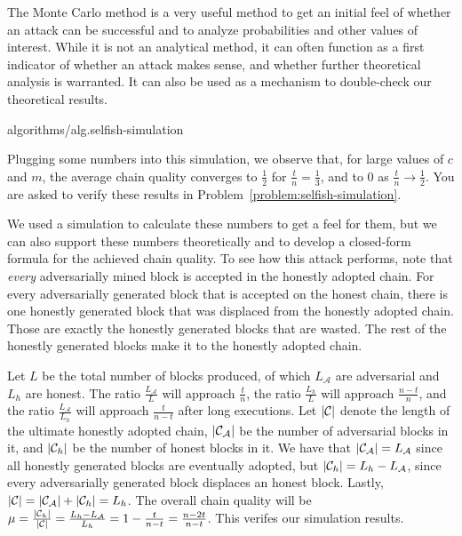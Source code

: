 The Monte Carlo method is a very useful method to get an initial feel of whether
an attack can be successful and to analyze probabilities and other values of interest.
While it is not an analytical method, it can often function as a first indicator
of whether an attack makes sense, and whether further theoretical analysis is warranted.
It can also be used as a mechanism to double-check our theoretical results.

{algorithms/alg.selfish-simulation}

Plugging some numbers into this simulation, we observe that, for large values of $c$
and $m$, the average chain quality converges to $\frac{1}{2}$ for $\frac{t}{n} = \frac{1}{3}$,
and to $0$ as $\frac{t}{n} \rightarrow \frac{1}{2}$. You are asked to verify these
results in Problem~\ref{problem:selfish-simulation}.

We used a simulation to calculate these numbers to get a feel for them, but we can also
support these numbers theoretically and to develop a closed-form formula for the achieved
chain quality. To see how this attack performs, note that \emph{every} adversarially
mined block is accepted in the honestly adopted chain. For every adversarially generated
block that is accepted on the honest chain, there is one honestly generated block that
was displaced from the honestly adopted chain. Those are exactly the honestly generated
blocks that are wasted. The rest of the honestly generated blocks make it to the honestly
adopted chain.

Let $L$ be the total number of blocks produced, of which $L_\mathcal{A}$ are
adversarial and $L_h$ are honest. The ratio $\frac{L_\mathcal{A}}{L}$ will
approach $\frac{t}{n}$, the ratio $\frac{L_h}{L}$ will approach
$\frac{n - t}{n}$, and the ratio $\frac{L_\mathcal{A}}{L_h}$
will approach $\frac{t}{n - t}$ after long executions.
Let $|\mathcal{C}|$ denote the length of the
ultimate honestly adopted chain, $|\mathcal{C}_\mathcal{A}|$ be the number of
adversarial blocks in it, and $|\mathcal{C}_h|$ be the number of honest blocks
in it. We have that $|\mathcal{C}_\mathcal{A}| = L_\mathcal{A}$ since all
honestly generated blocks are eventually adopted, but
$|\mathcal{C}_h| = L_h - L_\mathcal{A}$, since every adversarially generated
block displaces an honest block. Lastly,
$|\mathcal{C}| = |\mathcal{C}_\mathcal{A}| + |\mathcal{C}_h| = L_h$.
The overall chain quality will be
$\mu = \frac{|\mathcal{C}_h|}{|\mathcal{C}|} = \frac{L_h - L_\mathcal{A}}{L_h} = 1 - \frac{t}{n - t} = \frac{n - 2t}{n - t}$.
This verifes our simulation results.

